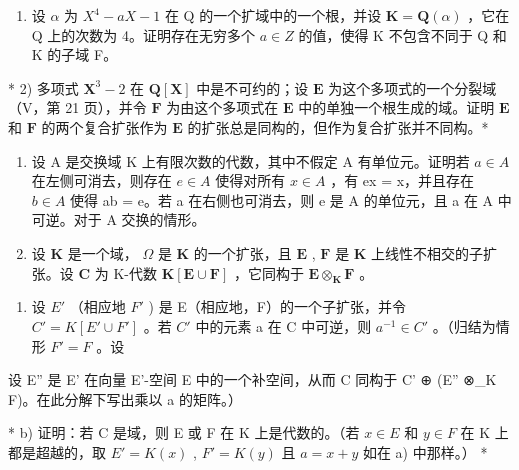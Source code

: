 \begin{enumerate}
\def\labelenumi{\alph{enumi})}
\setcounter{enumi}{1}
\tightlist
\item
  设 \(\alpha\) 为 \(X^{4}-aX-1\) 在 Q 的一个扩域中的一个根，并设 \(\mathbf{K}=\mathbf{Q}(\alpha)\) ，它在 Q 上的次数为 4。证明存在无穷多个 \(a\in Z\) 的值，使得 K 不包含不同于 Q 和 K 的子域 F。
\end{enumerate}

* 2) 多项式 \(\mathbf{X}^3 - 2\) 在 \(\mathbf{Q}[\mathbf{X}]\) 中是不可约的；设 \(\mathbf{E}\) 为这个多项式的一个分裂域（V，第 21 页），并令 \(\mathbf{F}\) 为由这个多项式在 \(\mathbf{E}\) 中的单独一个根生成的域。证明 \(\mathbf{E}\) 和 \(\mathbf{F}\) 的两个复合扩张作为 \(\mathbf{E}\) 的扩张总是同构的，但作为复合扩张并不同构。*

\begin{enumerate}
\def\labelenumi{\arabic{enumi})}
\setcounter{enumi}{2}
\item
  设 A 是交换域 K 上有限次数的代数，其中不假定 A 有单位元。证明若 \(a \in A\) 在左侧可消去，则存在 \(e \in A\) 使得对所有 \(x \in A\) ，有 ex = x，并且存在 \(b \in A\) 使得 ab = e。若 a 在右侧也可消去，则 e 是 A 的单位元，且 a 在 A 中可逆。对于 A 交换的情形。
\item
  设 \(\mathbf{K}\) 是一个域， \(\Omega\) 是 \(\mathbf{K}\) 的一个扩张，且 \(\mathbf{E}\) , \(\mathbf{F}\) 是 \(\mathbf{K}\) 上线性不相交的子扩张。设 \(\mathbf{C}\) 为 K-代数 \(\mathbf{K}[\mathbf{E} \cup \mathbf{F}]\) ，它同构于 \(\mathbf{E} \otimes_{\mathbf{K}} \mathbf{F}\) 。
\end{enumerate}

\begin{enumerate}
\def\labelenumi{\alph{enumi})}
\tightlist
\item
  设 \(E'\) （相应地 \(F'\) ) 是 E（相应地，F）的一个子扩张，并令 \(C' = K[E' \cup F']\) 。若 \(C'\) 中的元素 a 在 C 中可逆，则 \(a^{-1} \in C'\) 。（归结为情形 \(F' = F\) 。设
\end{enumerate}

设 E'' 是 E' 在向量 E'-空间 E 中的一个补空间，从而 C 同构于 C' ⊕ (E'' ⊗\_K F)。在此分解下写出乘以 a 的矩阵。）

* b) 证明：若 C 是域，则 E 或 F 在 K 上是代数的。（若 \(x \in E\) 和 \(y \in F\) 在 K 上都是超越的，取 \(E' = K(x)\) , \(F' = K(y)\) 且 \(a = x + y\) 如在 a) 中那样。） *
